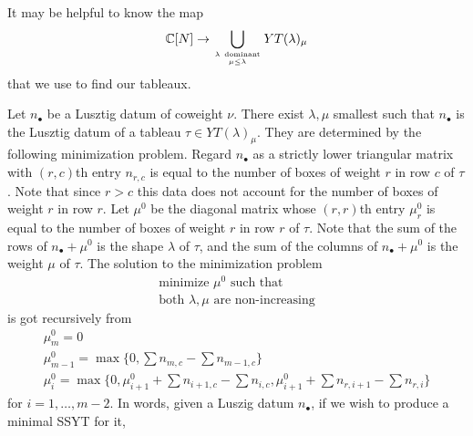\documentclass[draft]{article}
\begin{document}
It may be helpful to know the map
\[
    \mathbb C[N]\to \bigcup_{\lambda~\text{dominant}\atop \mu\le\lambda} YT(\lambda)_\mu 
\]
that we use to find our tableaux.
\begin{lemma}
    \label{lem:mintab}
    Let $n_\bullet$ be a Lusztig datum of coweight $\nu$. There exist $\lambda,\mu$ smallest such that $n_\bullet$ is the Lusztig datum of a tableau $\tau\in YT(\lambda)_\mu$. They are determined by the following minimization problem. Regard $n_\bullet$ as a strictly lower triangular matrix with $(r,c)$th entry $n_{r,c}$ is equal to the number of boxes of weight $r$ in row $c$ of $\tau$. Note that since $r > c$ this data does not account for the number of boxes of weight $r$ in row $r$. Let $\mu^0$ be the diagonal matrix whose $(r,r)$th entry $\mu^0_r$ is equal to the number of boxes of weight $r$ in row $r$ of $\tau$. Note that the sum of the rows of $n_\bullet + \mu^0$ is the shape $\lambda$ of $\tau$, and the sum of the columns of $n_\bullet + \mu^0$ is the weight $\mu$ of $\tau$. The solution to the minimization problem 
    \[
        \begin{gathered}
        \text{minimize }\mu^0\text{ such that} \\
        \text{both }\lambda,\mu\text{ are non-increasing}
        \end{gathered} 
    \]
    is got recursively from %
    \[
        \begin{gathered}
            \mu^0_{m} = 0 \\ 
            \mu^0_{m-1} = \max\{0 , \sum n_{m,c} - \sum n_{m-1,c}\} \\ 
            \mu^0_i = \max\{0, \mu^0_{i+1} + \sum n_{i+1,c} - \sum n_{i,c} , \mu_{i+1}^0 + \sum n_{r,i+1} - \sum n_{r,i}\}
        \end{gathered}
    \]
    for $i = 1,\dots,m-2$. 
    In words, given a Luszig datum $n_\bullet$, if we wish to produce a minimal SSYT for it, 

\end{lemma}
\end{document}
